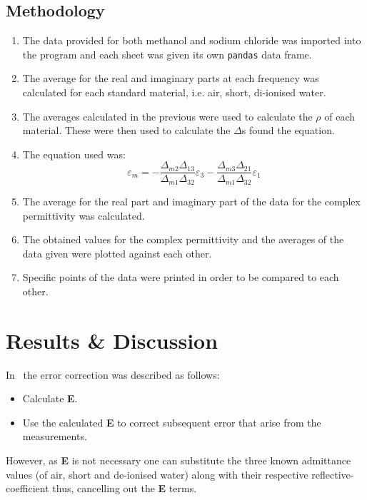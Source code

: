 \documentclass[12pt, a4paper]{article}
\begin{document}
\begin{multicols*}{2}
\subsection{Methodology}
\begin{enumerate}
    \item The data provided for both methanol and sodium chloride was imported into the program and each sheet was given its own \texttt{pandas} data frame.
    \item The average for the real and imaginary parts at each frequency was calculated for each standard material, i.e. air, short, di-ionised water.
    \item The averages calculated in the previous were used to calculate the \(\rho\) of each material. These were then used to calculate the \(\Delta\)s found the equation.
    \item The equation used was:
            \begin{equation}
                \varepsilon_m = -\frac{\Delta_{m2}\Delta_{13}}{\Delta_{m1}\Delta_{32}}\varepsilon_3 - \frac{\Delta_{m3}\Delta_{21}}{\Delta_{m1}\Delta_{32}}\varepsilon_1
            \end{equation}
    \item The average for the real part and imaginary part of the data for the complex permittivity was calculated.
    \item The obtained values for the complex permittivity and the averages of the data given were plotted against each other.
    \item Specific points of the data were printed in order to be compared to each other.
\end{enumerate}

\section{Results \& Discussion}
In~\cite{marsland1987dielectric} the error correction was described as follows:
\begin{itemize}
    \item Calculate \textbf{E}.
    \item Use the calculated \textbf{E} to correct subsequent error that arise from the measurements.
\end{itemize}
However, as \textbf{E} is not necessary one can substitute the three known admittance values (of air, short and de-ionised water) along with their respective reflective-coefficient thus, cancelling out the \textbf{E} terms.


\end{multicols*}
\end{document}
